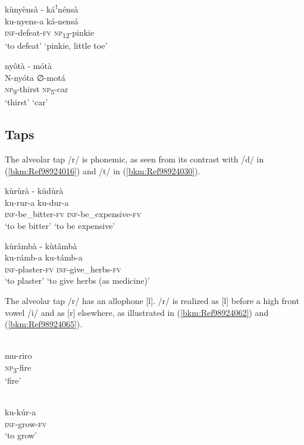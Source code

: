 \ea
kùnyènsà  \tab  - \tab káꜝnénsà\\
ku-nyens-a   \tab\tab   ká-nensá\\
\textsc{inf}-defeat-\textsc{fv}  \tab\tab  \textsc{np}\textsubscript{12}-pinkie\\
\glt ‘to defeat’   \tab\tab   ‘pinkie, little toe’
\z

\ea
\label{bkm:Ref75345979}
nyôtà   \tab   - \tab mótà\\
N-nyóta  \tab\tab    ∅-motá\\
\textsc{np}\textsubscript{9}-thirst   \tab\tab   \textsc{np}\textsubscript{5}-car\\
\glt ‘thirst’  \tab\tab      ‘car’
\z
\subsection{Taps}

The alveolar tap /r/ is phonemic, as seen from its contrast with /d/ in (\ref{bkm:Ref98924016}) and /t/ in (\ref{bkm:Ref98924030}).

\ea
\label{bkm:Ref98924016}
kùrùrà  \tab  - \tab kùdùrà\\
ku-rur-a  \tab\tab    ku-dur-a\\
\textsc{inf}-be\_bitter-\textsc{fv} \tab\tab   \textsc{inf}-be\_expensive-\textsc{fv}\\
\glt ‘to be bitter’  \tab\tab    ‘to be expensive’
\z

\ea
\label{bkm:Ref98924030}
kùrâmbà  \tab  - \tab kùtâmbà\\
ku-rámb-a  \tab\tab    ku-támb-a\\
\textsc{inf}-plaster-\textsc{fv} \tab\tab   \textsc{inf}-give\_herbs-\textsc{fv}\\
\glt ‘to plaster’  \tab\tab    ‘to give herbs (as medicine)’
\z

The alveolar tap /r/ has an allophone [l]. /r/ is realized as [l] before a high front vowel /i/ and as [r] elsewhere, as illustrated in (\ref{bkm:Ref98924062}) and (\ref{bkm:Ref98924065}).

\ea
\label{bkm:Ref98924062}
\glll [mùlìrò]\\
mu-riro\\
\textsc{np}\textsubscript{3}-fire\\
\glt ‘fire’
\z

\ea
\label{bkm:Ref98924065}
\glll [kùkûrà]\\
ku-kúr-a\\
\textsc{inf}-grow-\textsc{fv}\\
\glt ‘to grow’
\z

